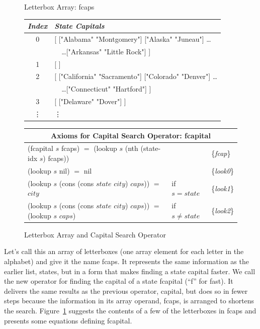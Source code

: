 \begin{figure}
\begin{center}
Letterbox Array: \textsf{fcaps}
\begin{tabular}{c|l}
\emph{Index} &\emph{State Capitals} \\
\hline
0 & \textsf{[ ["Alabama"  "Montgomery"] ["Alaska"   "Juneau"] \dots } \\
  & \textsf{~~\dots ["Arkansas"  "Little Rock"] ]}  \\ %
1 & \textsf{[ ]}\\
2 & \textsf{[ ["California"  "Sacramento"] ["Colorado"  "Denver"] \dots } \\
  & \textsf{~~\dots ["Connecticut"  "Hartford"] }]\\
3 & \textsf{[ ["Delaware"  "Dover"] ]}\\
\vdots & \hspace*{15mm}\vdots\\
\end{tabular}
\begin{tabular}{lll}
\multicolumn{3}{c}{Axioms for Capital Search Operator: \textsf{fcapital}}\\
\hline
\textsf{(fcapital} $s$ \textsf{fcaps)} $=$ \textsf{(lookup} $s$ \textsf{(nth (state-idx} $s$) \textsf{fcaps))} && \{\emph{fcap}\} \\
\textsf{(lookup} $s$ \textsf{nil)} $=$ \textsf{nil}  && \{\emph{look0}\}     \\
\textsf{(lookup} $s$ \textsf{(cons (cons} $state$ $city$\textsf{)} $caps$\textsf{))} $=$ $city$ &if $s = state$ & \{\emph{look1}\} \\
\textsf{(lookup} $s$ \textsf{(cons (cons} $state$ $city$) $caps$\textsf{))} $=$ \textsf{(lookup} $s$ $caps$\textsf{)} &if $s \ne state$ & \{\emph{look2}\} \\
\end{tabular}
\end{center}
\caption{Letterbox Array and Capital Search Operator}
\label{fig:fcaps-array}
\end{figure}

Let's call this an array of letterboxes
(one array element for each letter in the alphabet)
and give it the name \textsf{fcaps}.
It represents the same information as the earlier list, \textsf{states},
but in a form that makes finding a state capital faster.
We call the new operator for finding the capital of a state
\textsf{fcapital} (``f'' for fast).
It delivers the same results
as the previous operator, \textsf{capital},
but does so in fewer steps because the information in its array operand,
\textsf{fcaps}, is arranged to shortens the search.
Figure~\ref{fig:fcaps-array} suggests the contents of a few
of the letterboxes in \textsf{fcaps} and presents some
equations defining \textsf{fcapital}.

